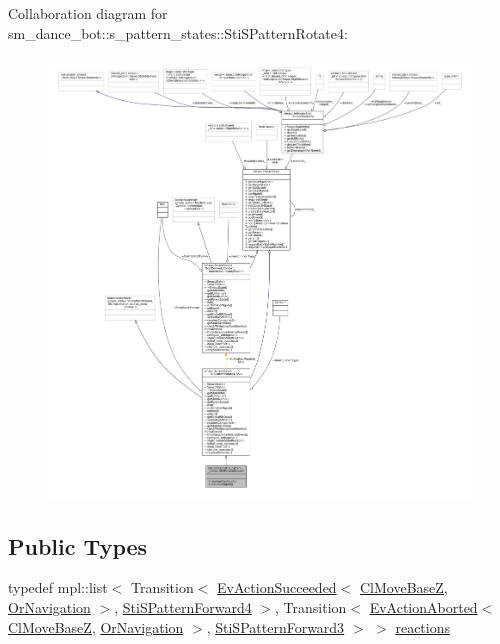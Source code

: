 Collaboration diagram for sm\+\_\+dance\+\_\+bot\+:\+:s\+\_\+pattern\+\_\+states\+:\+:Sti\+S\+Pattern\+Rotate4\+:
\nopagebreak
\begin{figure}[H]
\begin{center}
\leavevmode
\includegraphics[width=350pt]{structsm__dance__bot_1_1s__pattern__states_1_1StiSPatternRotate4__coll__graph}
\end{center}
\end{figure}
\subsection*{Public Types}
\begin{DoxyCompactItemize}
\item 
typedef mpl\+::list$<$ Transition$<$ \hyperlink{structsmacc_1_1default__events_1_1EvActionSucceeded}{Ev\+Action\+Succeeded}$<$ \hyperlink{classcl__move__base__z_1_1ClMoveBaseZ}{Cl\+Move\+BaseZ}, \hyperlink{classsm__dance__bot_1_1OrNavigation}{Or\+Navigation} $>$, \hyperlink{structsm__dance__bot_1_1s__pattern__states_1_1StiSPatternForward4}{Sti\+S\+Pattern\+Forward4} $>$, Transition$<$ \hyperlink{structsmacc_1_1default__events_1_1EvActionAborted}{Ev\+Action\+Aborted}$<$ \hyperlink{classcl__move__base__z_1_1ClMoveBaseZ}{Cl\+Move\+BaseZ}, \hyperlink{classsm__dance__bot_1_1OrNavigation}{Or\+Navigation} $>$, \hyperlink{structsm__dance__bot_1_1s__pattern__states_1_1StiSPatternForward3}{Sti\+S\+Pattern\+Forward3} $>$ $>$ \hyperlink{structsm__dance__bot_1_1s__pattern__states_1_1StiSPatternRotate4_a79688efd233c787e1328cd13a5fd0166}{reactions}
\end{DoxyCompactItemize}
